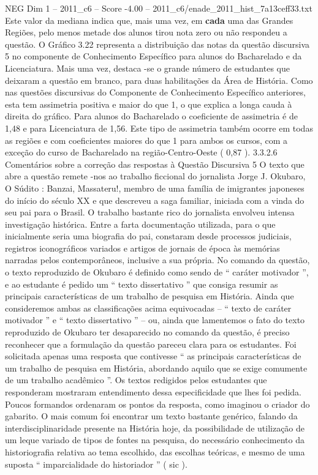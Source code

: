 \begin{textsample}{NEG Dim 1 – 2011\_c6 – Score -4.00 – 2011\_c6/enade\_2011\_hist\_7a13ceff33.txt}
Este valor da mediana indica que, mais uma vez, em \textbf{cada} uma das Grandes Regiões, pelo menos metade dos alunos tirou nota zero ou não respondeu a questão.
O Gráfico 3.22 representa a distribuição das notas da questão discursiva 5 no componente de Conhecimento Específico para alunos do Bacharelado e da Licenciatura.
Mais uma vez, destaca -se o grande número de estudantes que deixaram a questão em branco, para duas habilitações da Área de História.
Como nas questões discursivas do Componente de Conhecimento Específico anteriores, esta tem assimetria positiva e maior do que 1, o que explica a longa cauda à direita do gráfico.
Para alunos do Bacharelado o coeficiente de assimetria é de 1,48 e para Licenciatura de 1,56.
Este tipo de assimetria também ocorre em todas as regiões e com coeficientes maiores do que 1 para ambos os cursos, com a exceção do curso de Bacharelado na região-Centro-Oeste ( 0,87 ). 3.3.2.6 Comentários sobre a correção das respostas à Questão Discursiva 5 O texto que abre a questão remete -nos ao trabalho ficcional do jornalista Jorge J.
Okubaro, O Súdito : Banzai, Massateru!, membro de uma família de imigrantes japoneses do início do século XX e que descreveu a saga familiar, iniciada com a vinda do seu pai para o Brasil.
O trabalho bastante rico do jornalista envolveu intensa investigação histórica.
Entre a farta documentação utilizada, para o que inicialmente seria uma biografia do pai, constaram desde processos judiciais, registros iconográficos variados e artigos de jornais de época às memórias narradas pelos contemporâneos, inclusive a sua própria.
No comando da questão, o texto reproduzido de Okubaro é definido como sendo de “ caráter motivador ”, e ao estudante é pedido um “ texto dissertativo ” que consiga resumir as principais características de um trabalho de pesquisa em História.
Ainda que consideremos ambas as classificações acima equivocadas – “ texto de caráter motivador ” e “ texto dissertativo ” – ou, ainda que lamentemos o fato do texto reproduzido de Okubaro ter desaparecido no comando da questão, é preciso reconhecer que a formulação da questão pareceu clara para os estudantes.
Foi solicitada apenas uma resposta que contivesse “ as principais características de um trabalho de pesquisa em História, abordando aquilo que se exige comumente de um trabalho acadêmico ”.
Os textos redigidos pelos estudantes que responderam mostraram entendimento dessa especificidade que lhes foi pedida.
Poucos formandos ordenaram os pontos da resposta, como imaginou o criador do gabarito.
O mais comum foi encontrar um texto bastante genérico, falando da interdisciplinaridade presente na História hoje, da possibilidade de utilização de um leque variado de tipos de fontes na pesquisa, do necessário conhecimento da historiografia relativa ao tema escolhido, das escolhas teóricas, e mesmo de uma suposta “ imparcialidade do historiador ” ( sic ).

\end{textsample}
